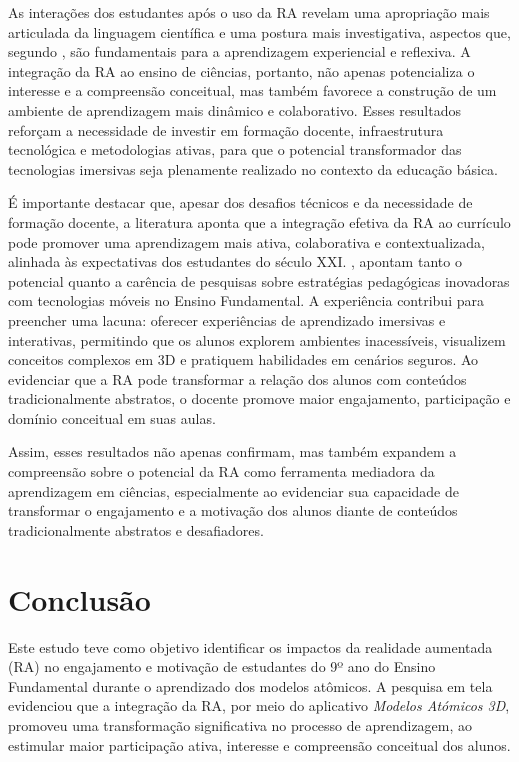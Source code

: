 \documentclass[portuguese]{textolivre}
\begin{document}
As interações dos estudantes após o uso da RA revelam uma apropriação mais articulada da linguagem científica e uma postura mais investigativa, aspectos que, segundo \textcite{caberoalmenara2025}, são fundamentais para a aprendizagem experiencial e reflexiva. A integração da RA ao ensino de ciências, portanto, não apenas potencializa o interesse e a compreensão conceitual, mas também favorece a construção de um ambiente de aprendizagem mais dinâmico e colaborativo. Esses resultados reforçam a necessidade de investir em formação docente, infraestrutura tecnológica e metodologias ativas, para que o potencial transformador das tecnologias imersivas seja plenamente realizado no contexto da educação básica.

É importante destacar que, apesar dos desafios técnicos e da necessidade de formação docente, a literatura aponta que a integração efetiva da RA ao currículo pode promover uma aprendizagem mais ativa, colaborativa e contextualizada, alinhada às expectativas dos estudantes do século XXI. \textcite{nascimento2016, nascimento2017}, apontam tanto o potencial quanto a carência de pesquisas sobre estratégias pedagógicas inovadoras com tecnologias móveis no Ensino Fundamental. A experiência contribui para preencher uma lacuna: oferecer experiências de aprendizado imersivas e interativas, permitindo que os alunos explorem ambientes inacessíveis, visualizem conceitos complexos em 3D e pratiquem habilidades em cenários seguros. Ao evidenciar que a RA pode transformar a relação dos alunos com conteúdos tradicionalmente abstratos, o docente promove maior engajamento, participação e domínio conceitual em suas aulas.

Assim, esses resultados não apenas confirmam, mas também expandem a compreensão sobre o potencial da RA como ferramenta mediadora da aprendizagem em ciências, especialmente ao evidenciar sua capacidade de transformar o engajamento e a motivação dos alunos diante de conteúdos tradicionalmente abstratos e desafiadores.

\section{Conclusão}
Este estudo teve como objetivo identificar os impactos da realidade aumentada (RA) no engajamento e motivação de estudantes do 9º ano do Ensino Fundamental durante o aprendizado dos modelos atômicos. A pesquisa em tela evidenciou que a integração da RA, por meio do aplicativo \emph{Modelos Atómicos 3D}, promoveu uma transformação significativa no processo de aprendizagem, ao estimular maior participação ativa, interesse e compreensão conceitual dos alunos.
\end{document}
